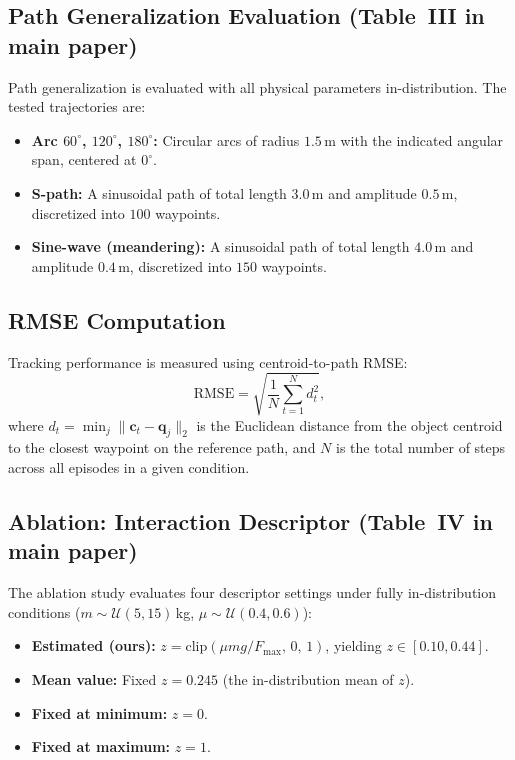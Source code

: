 \subsection{Path Generalization Evaluation (Table~III in main paper)}

Path generalization is evaluated with all physical parameters in-distribution.
The tested trajectories are:
\begin{itemize}
    \item \textbf{Arc $60^\circ$, $120^\circ$, $180^\circ$:} Circular arcs of radius $1.5$\,m with the indicated angular span, centered at $0^\circ$.
    \item \textbf{S-path:} A sinusoidal path of total length $3.0$\,m and amplitude $0.5$\,m, discretized into $100$ waypoints.
    \item \textbf{Sine-wave (meandering):} A sinusoidal path of total length $4.0$\,m and amplitude $0.4$\,m, discretized into $150$ waypoints.
\end{itemize}

\subsection{RMSE Computation}

Tracking performance is measured using centroid-to-path RMSE:
%
\begin{equation}
    \mathrm{RMSE} = \sqrt{\frac{1}{N} \sum_{t=1}^{N} d_t^2},
\end{equation}
%
where $d_t = \min_{j} \| \mathbf{c}_t - \mathbf{q}_j \|_2$ is the Euclidean distance from the object centroid to the closest waypoint on the reference path, and $N$ is the total number of steps across all episodes in a given condition.

\subsection{Ablation: Interaction Descriptor (Table~IV in main paper)}

The ablation study evaluates four descriptor settings under fully in-distribution conditions ($m \sim \mathcal{U}(5, 15)$\,kg, $\mu \sim \mathcal{U}(0.4, 0.6)$):
\begin{itemize}
    \item \textbf{Estimated (ours):} $z = \mathrm{clip}(\mu m g / F_{\max},\, 0,\, 1)$, yielding $z \in [0.10, 0.44]$.
    \item \textbf{Mean value:} Fixed $z = 0.245$ (the in-distribution mean of $z$).
    \item \textbf{Fixed at minimum:} $z = 0$.
    \item \textbf{Fixed at maximum:} $z = 1$.
\end{itemize}


